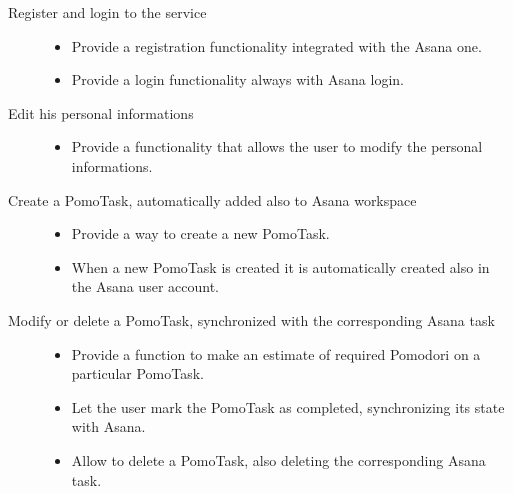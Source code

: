 	\begin{description}

		\item[Register and login to the service]\hfill
			
			\begin{itemize}

				\item Provide a registration functionality integrated with the Asana one.

				\item Provide a login functionality always with Asana login.

			\end{itemize}

		\item[Edit his personal informations]\hfill

			\begin{itemize}

				\item Provide a functionality that allows the user to modify the personal informations.

			\end{itemize}

		\item[Create a PomoTask, automatically added also to Asana workspace]\hfill

			\begin{itemize}

				\item Provide a way to create a new PomoTask.

				\item When a new PomoTask is created it is automatically created also in the Asana user account.

			\end{itemize}

		\item[Modify or delete a PomoTask, synchronized with the corresponding Asana task]\hfill

			\begin{itemize}

				\item Provide a function to make an estimate of required Pomodori on a particular PomoTask.

				\item Let the user mark the PomoTask as completed, synchronizing its state with Asana.

				\item Allow to delete a PomoTask, also deleting the corresponding Asana task.


\end{itemize}
\end{description}
